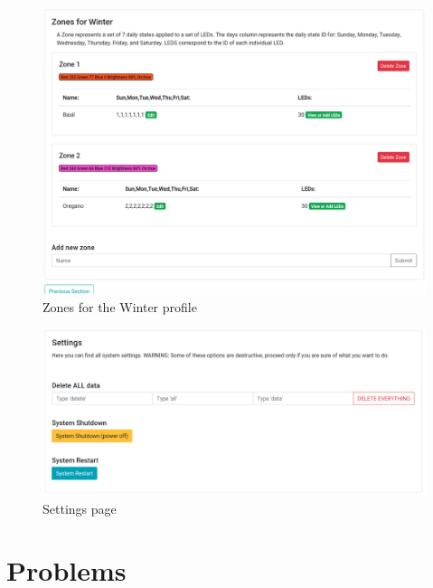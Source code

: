\documentclass[onecolumn, draftclsnofoot,10pt, compsoc]{IEEEtran}
\begin{document}
	\begin{center}
		\begin{figure}[H]
			\includegraphics[width=\linewidth]{site/zones_winter.png}
			\caption{Zones for the Winter profile}
			\label{fig:siteZonesWinter}
		\end{figure}
	\end{center}
	\begin{center}
		\begin{figure}[H]
			\includegraphics[width=\linewidth]{site/settings.png}
			\caption{Settings page}
			\label{fig:siteSettings}
		\end{figure}
	\end{center}


	\section{Problems}
\end{document}
